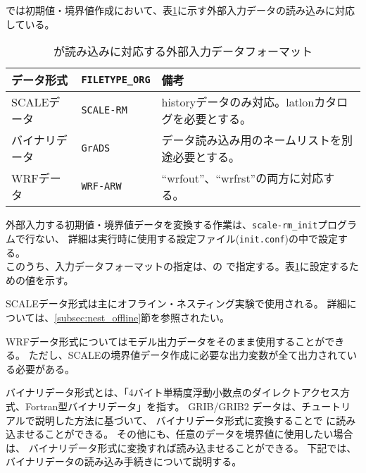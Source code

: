 \section{\SecInputDataSetting} \label{sec:adv_datainput}

\scalerm では初期値・境界値作成において、表\ref{tab:inputdata_format}に示す外部入力データの読み込みに対応している。

\begin{table}[htb]
\begin{center}
\caption{\scalelib が読み込みに対応する外部入力データフォーマット}
\begin{tabularx}{150mm}{|l|l|X|} \hline
 \rowcolor[gray]{0.9} データ形式      & \verb|FILETYPE_ORG|  & 備考 \\ \hline
 SCALEデータ   & \verb|SCALE-RM|     & historyデータのみ対応。latlonカタログを必要とする。 \\ \hline
 バイナリデータ & \verb|GrADS|        & データ読み込み用のネームリストを別途必要とする。       \\ \hline
 WRFデータ     & \verb|WRF-ARW|      & ``wrfout''、``wrfrst''の両方に対応する。          \\ \hline
\end{tabularx}
\label{tab:inputdata_format}
\end{center}
\end{table}


外部入力する初期値・境界値データを変換する作業は、\verb|scale-rm_init|プログラムで行ない、
詳細は実行時に使用する設定ファイル(\verb|init.conf|)の中で設定する。\\
このうち、入力データフォーマットの指定は、の
で指定する。表\ref{tab:inputdata_format}に設定するための値を示す。

SCALEデータ形式は主にオフライン・ネスティング実験で使用される。
詳細については、\ref{subsec:nest_offline}節を参照されたい。


WRFデータ形式についてはモデル出力データをそのまま使用することができる。
ただし、SCALEの境界値データ作成に必要な出力変数が全て出力されている必要がある。

バイナリデータ形式とは、「4バイト単精度浮動小数点のダイレクトアクセス方式、Fortran型バイナリデータ」を指す。
GRIB/GRIB2 データは、チュートリアルで説明した方法に基づいて、
バイナリデータ形式に変換することで {\scalerm} に読み込ませることができる。
その他にも、任意のデータを境界値に使用したい場合は、
バイナリデータ形式に変換すれば読み込ませることができる。
下記では、バイナリデータの読み込み手続きについて説明する。

